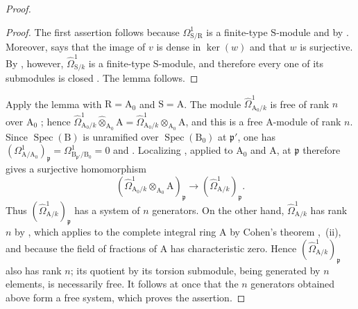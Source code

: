 \begin{proof}
\begin{proof}
The first assertion follows because $\Omega^1_{\mathrm{S}/\mathrm{R}}$ is a finite-type $\mathrm{S}$-module  and by . Moreover,  says that the image of $v$ is dense in $\ker(w)$ and that $w$ is surjective. By , however, $\hat{\Omega}^1_{\mathrm{S}/k}$ is a finite-type $\mathrm{S}$-module, and therefore every one of its submodules is closed . The lemma follows.
\end{proof}

Apply the lemma with $\mathrm{R}=\mathrm{A}_0$ and $\mathrm{S}=\mathrm{A}$. The module $\hat{\Omega}^1_{\mathrm{A}_0/k}$ is free of rank $n$ over $\mathrm{A}_0$ ; hence
$\hat{\Omega}^1_{\mathrm{A}_0/k}\widehat{\otimes}_{\mathrm{A}_0}\mathrm{A}=\hat{\Omega}^1_{\mathrm{A}_0/k}\otimes_{\mathrm{A}_0}\mathrm{A}$, and this is a free $\mathrm{A}$-module of rank $n$. Since $\operatorname{Spec}(\mathrm{B})$ is unramified over $\operatorname{Spec}(\mathrm{B}_0)$ at $\mathfrak{p}'$, one has
$(\Omega^1_{\mathrm{A}/\mathrm{A}_0})_{\mathfrak{p}}=\Omega^1_{\mathrm{B}_{\mathfrak{p}'}/\mathrm{B}_0}=0$  and . Localizing , applied to $\mathrm{A}_0$ and $\mathrm{A}$, at $\mathfrak{p}$ therefore gives a surjective homomorphism
\[
  (\hat{\Omega}^1_{\mathrm{A}_0/k}\otimes_{\mathrm{A}_0}\mathrm{A})_{\mathfrak{p}}
  \longrightarrow(\hat{\Omega}^1_{\mathrm{A}/k})_{\mathfrak{p}}.
\]
Thus $(\hat{\Omega}^1_{\mathrm{A}/k})_{\mathfrak{p}}$ has a system of $n$ generators. On the other hand, $\hat{\Omega}^1_{\mathrm{A}/k}$ has rank $n$ by , which applies to the complete integral ring $\mathrm{A}$ by Cohen's theorem ,~(ii), and because the field of fractions of $\mathrm{A}$ has characteristic zero. Hence $(\hat{\Omega}^1_{\mathrm{A}/k})_{\mathfrak{p}}$ also has rank $n$; its quotient by its torsion submodule, being generated by $n$ elements, is necessarily free. It follows at once that the $n$ generators obtained above form a free system, which proves the assertion.
\end{proof}

